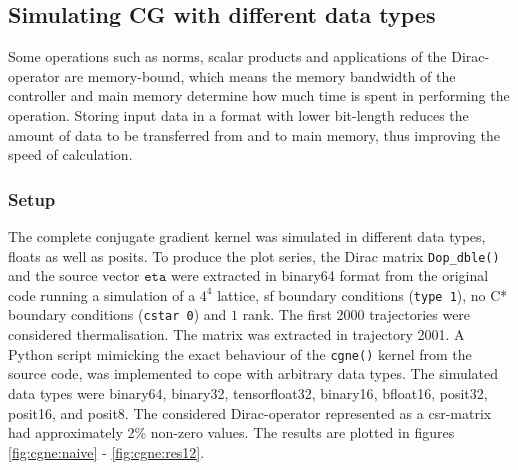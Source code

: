 \documentclass{article}
\theoremstyle{plain} %
\theoremstyle{convention} %
\theoremstyle{remark} %
\def\code#1{\texttt{#1}}
\numberwithin{equation}{section}
\begin{document}
\subsection{Simulating CG with different data types}

\label{sec:simulating_cgne}

Some operations such as norms, scalar products and applications of the Dirac-operator are memory-bound, which means the memory bandwidth of the controller and main memory determine how much time is spent in performing the operation. Storing input data in a format with lower bit-length reduces the amount of data to be transferred from and to main memory, thus improving the speed of calculation.

\subsubsection{Setup}

The complete conjugate gradient kernel was simulated in different data types, floats as well as posits. To produce the plot series, the Dirac matrix \code{Dop\_dble()} and the source vector $\code{eta}$ were extracted in \gls{binary64} format from the original code running a simulation of a $4^4$ lattice, \acrfull{sf} boundary conditions (\code{type 1}), no C* boundary conditions (\code{cstar 0}) and $1$ rank. The first \num{2000} trajectories were considered thermalisation. The matrix was extracted in trajectory \num{2001}. A Python script mimicking the exact behaviour of the \code{cgne()} kernel from the source code, was implemented to cope with arbitrary data types. The simulated data types were \gls{binary64}, \gls{binary32}, \gls{tensorfloat32}, \gls{binary16}, \gls{bfloat16}, \gls{posit32}, \gls{posit16}, and \gls{posit8}. The considered Dirac-operator represented as a \acrshort{csr}-matrix had approximately \num{2}\% non-zero values. The results are plotted in figures \ref{fig:cgne:naive} - \ref{fig:cgne:res12}.
\end{document}
